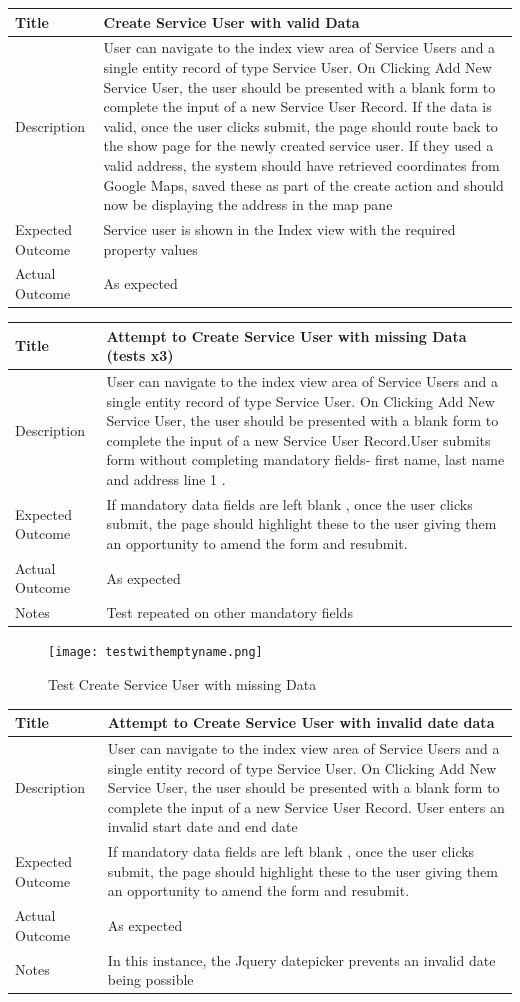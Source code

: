 \documentclass[a4paper,Times New Roman 11pt]{article}
\newcommand\addrow[2]{#1 &#2\\ }
\newcommand\addheading[2]{#1 &#2\\ \hline}
\newcommand\tabularhead{\begin{tabular}{lp{9cm}}
\hline
}
\newenvironment{usecase}{\tabularhead}
{\hline\end{tabular}}
\begin{document}
\begin{usecase}
    \addheading{Title}{Create Service User with valid Data}
  \addheading{Description}{User can navigate to the index view area of Service Users and a single entity record of type Service User. On Clicking Add New Service User, the user should be presented with a blank form to complete the input of a new Service User Record. If the data is valid, once the user clicks submit, the page should route back to the show page for the newly created service user. If they used a valid address, the system should have retrieved coordinates from Google Maps, saved these as part of the create action and should now be displaying the address in the map pane}
  \addrow{Expected Outcome}{Service user is shown in the Index view with the required property values}
  \addrow{Actual Outcome}{As expected}
\end{usecase}

\begin{usecase}
    \addheading{Title}{Attempt to Create Service User with missing Data (tests x3)}
  \addheading{Description}{User can navigate to the index view area of Service Users and a single entity record of type Service User. On Clicking Add New Service User, the user should be presented with a blank form to complete the input of a new Service User Record.User submits form without completing mandatory fields- first name, last name and address line 1 .}
  \addrow{Expected Outcome}{If mandatory data fields are left blank , once the user clicks submit, the page should highlight these to the user giving them an opportunity to amend the form and resubmit.}
  \addrow{Actual Outcome}{As expected}
  \addrow{Notes}{Test repeated on other mandatory fields}
\end{usecase}

 \begin{figure}[h!]
\texttt{[image: testwithemptyname.png]}
  \caption{Test Create Service User with missing Data}
  \label{fig:Test Create Service User with missing Data}
\end{figure}

\begin{usecase}
    \addheading{Title}{Attempt to Create Service User with invalid date data}
  \addheading{Description}{User can navigate to the index view area of Service Users and a single entity record of type Service User. On Clicking Add New Service User, the user should be presented with a blank form to complete the input of a new Service User Record. User enters an invalid start date and end date}
  \addrow{Expected Outcome}{If mandatory data fields are left blank , once the user clicks submit, the page should highlight these to the user giving them an opportunity to amend the form and resubmit.}
  \addrow{Actual Outcome}{As expected}
  \addrow{Notes}{In this instance, the Jquery datepicker prevents an invalid date being possible}
\end{usecase}
\end{document}
